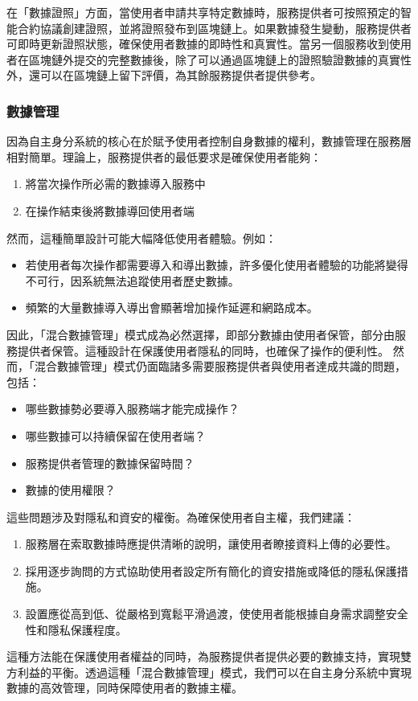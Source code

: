 在「數據證照」方面，當使用者申請共享特定數據時，服務提供者可按照預定的智能合約協議創建證照，並將證照發布到區塊鏈上。如果數據發生變動，服務提供者可即時更新證照狀態，確保使用者數據的即時性和真實性。當另一個服務收到使用者在區塊鏈外提交的完整數據後，除了可以通過區塊鏈上的證照驗證數據的真實性外，還可以在區塊鏈上留下評價，為其餘服務提供者提供參考。
\subsubsection{數據管理}
因為自主身分系統的核心在於賦予使用者控制自身數據的權利，數據管理在服務層相對簡單。理論上，服務提供者的最低要求是確保使用者能夠：
\begin{enumerate}
  \item 將當次操作所必需的數據導入服務中
  \item 在操作結束後將數據導回使用者端
\end{enumerate}
然而，這種簡單設計可能大幅降低使用者體驗。例如：
\begin{itemize}
  \item 若使用者每次操作都需要導入和導出數據，許多優化使用者體驗的功能將變得不可行，因系統無法追蹤使用者歷史數據。
  \item 頻繁的大量數據導入導出會顯著增加操作延遲和網路成本。
\end{itemize}
因此，「混合數據管理」模式成為必然選擇，即部分數據由使用者保管，部分由服務提供者保管。這種設計在保護使用者隱私的同時，也確保了操作的便利性。
然而，「混合數據管理」模式仍面臨諸多需要服務提供者與使用者達成共識的問題，包括：
\begin{itemize}
  \item 哪些數據勢必要導入服務端才能完成操作？
  \item 哪些數據可以持續保留在使用者端？
  \item 服務提供者管理的數據保留時間？
  \item 數據的使用權限？
\end{itemize}
這些問題涉及對隱私和資安的權衡。為確保使用者自主權，我們建議：
\begin{enumerate}
  \item 服務層在索取數據時應提供清晰的說明，讓使用者瞭接資料上傳的必要性。
  \item 採用逐步詢問的方式協助使用者設定所有簡化的資安措施或降低的隱私保護措施。
  \item 設置應從高到低、從嚴格到寬鬆平滑過渡，使使用者能根據自身需求調整安全性和隱私保護程度。
\end{enumerate}
這種方法能在保護使用者權益的同時，為服務提供者提供必要的數據支持，實現雙方利益的平衡。透過這種「混合數據管理」模式，我們可以在自主身分系統中實現數據的高效管理，同時保障使用者的數據主權。
